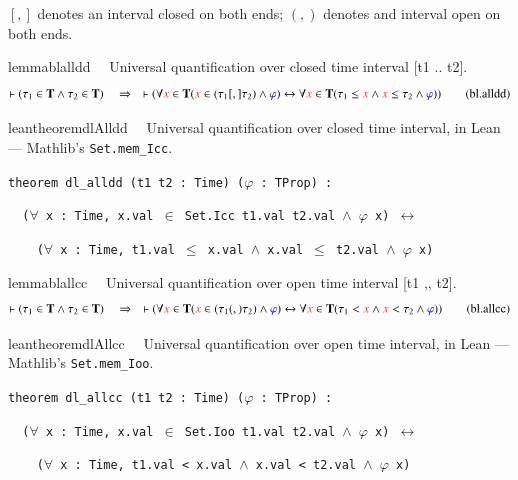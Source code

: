 \pn $[,]$ denotes an interval closed on both ends;
$(,)$ denotes and interval open  on both ends.

\begin{restatable}{lemma}{blalldd}~~ Universal quantification over closed time
interval [t1 .. t2].
\begin{align}
\vdash ( \tau_1 \in \mathbf{T} \wedge \tau_2 \in \mathbf{T}
    )\quad\Rightarrow\quad \vdash ( \forall \msc{x} \in \mathbf{T} ( \msc{x}
    \in ( \tau_1 [,] \tau_2 ) \wedge \mw{\varphi} ) \leftrightarrow \forall
    \msc{x} \in \mathbf{T} ( \tau_1 \le \msc{x} \wedge \msc{x} \le \tau_2
    \wedge \mw{\varphi} ) )\label{eq:bl.alldd}\tag{bl.alldd}
\end{align}
\end{restatable}

\begin{restatable}{leantheorem}{dlAlldd}~~ Universal quantification over closed time
interval, in Lean --- Mathlib's \texttt{Set.mem\_Icc}.

\texttt{\textcolor{leancolor}{theorem} \textcolor{leanyellow}{dl\_alldd} (t1 t2 : Time) ($\varphi$ : TProp) :}

\texttt{~~($\forall$ x : Time, x.val $\in$ Set.Icc t1.val t2.val $\wedge$ $\varphi$ x) $\leftrightarrow$}

\texttt{~~~~($\forall$ x : Time, t1.val $\le$ x.val $\wedge$ x.val $\le$ t2.val $\wedge$ $\varphi$ x)}
\label{dl_alldd}
\end{restatable}

\begin{restatable}{lemma}{blallcc}~~ Universal quantification over open time
interval [t1 ,, t2].
\begin{align}
\vdash ( \tau_1 \in \mathbf{T} \wedge \tau_2 \in \mathbf{T}
    )\quad\Rightarrow\quad \vdash ( \forall \msc{x} \in \mathbf{T} ( \msc{x}
    \in ( \tau_1 (,) \tau_2 ) \wedge \mw{\varphi} ) \leftrightarrow \forall
    \msc{x} \in \mathbf{T} ( \tau_1 < \msc{x} \wedge \msc{x} < \tau_2 \wedge
    \mw{\varphi} ) )\label{eq:bl.allcc}\tag{bl.allcc}
\end{align}
\end{restatable}

\begin{restatable}{leantheorem}{dlAllcc}~~ Universal quantification over open time
interval, in Lean --- Mathlib's \texttt{Set.mem\_Ioo}.

\texttt{\textcolor{leancolor}{theorem} \textcolor{leanyellow}{dl\_allcc} (t1 t2 : Time) ($\varphi$ : TProp) :}

\texttt{~~($\forall$ x : Time, x.val $\in$ Set.Ioo t1.val t2.val $\wedge$ $\varphi$ x) $\leftrightarrow$}

\texttt{~~~~($\forall$ x : Time, t1.val < x.val $\wedge$ x.val < t2.val $\wedge$ $\varphi$ x)}
\label{dl_allcc}
\end{restatable}

